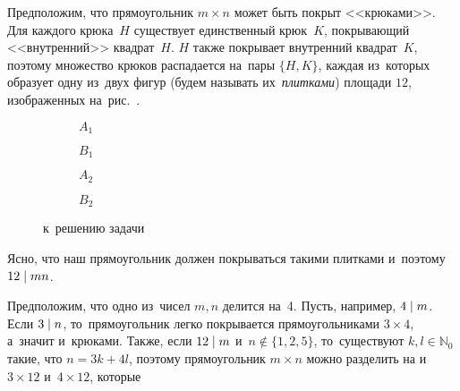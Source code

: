 \ifincludesolutions
Предположим, что прямоугольник $m \times n$ может быть покрыт <<крюками>>.
Для каждого крюка~$H$ существует единственный крюк~$K$, покрывающий
<<внутренний>> квадрат~$H$.
$H$ также покрывает внутренний квадрат~$K$, поэтому множество крюков
распадается на~пары $\{ H, K \}$, каждая из~которых образует одну из~двух фигур
(будем называть их~\emph{плитками}) площади $12$, изображенных
на~рис.~.
\begin{figure}[ht]\begin{center}
\strut\hfill
    \begin{subfigure}{0.2\linewidth}\begin{center}
     $A_1$
    \end{center}\end{subfigure}
\hfill
    \begin{subfigure}{0.15\linewidth}\begin{center}
     $B_1$
    \end{center}\end{subfigure}
\hfill
    \begin{subfigure}{0.2\linewidth}\begin{center}
     $A_2$
    \end{center}\end{subfigure}
\hfill
    \begin{subfigure}{0.2\linewidth}\begin{center}
     $B_2$
    \end{center}\end{subfigure}
\hfill\strut
\caption{к~решению
    задачи~}%
\end{center}\end{figure}
Ясно, что наш прямоугольник должен покрываться такими плитками и~поэтому
$12 \mathrel{\vert} m n$.
\par
Предположим, что одно из~чисел $m, n$ делится на~4.
Пусть, например, $4 \mathrel{\vert} m$.
Если $3 \mathrel{\vert} n$, то~прямоугольник легко покрывается прямоугольниками
$3 \times 4$, а~значит и~крюками.
Также, если $12 \mathrel{\vert} m$ и~$n \notin \{ 1, 2, 5 \}$, то~существуют
$k, l \in \mathbb{N}_0$ такие, что $n = 3 k + 4 l$, поэтому прямоугольник
$m \times n$ можно разделить на и~$3 \times 12$ и~$4 \times 12$, которые
